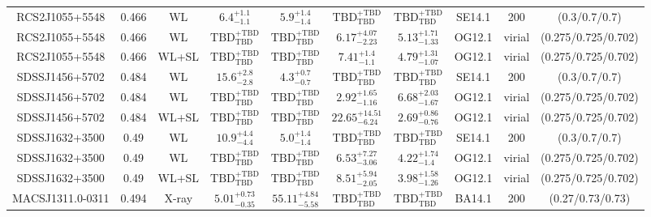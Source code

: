\begin{table}
\begin{tabular}{cccccccccc}
RCS2J1055+5548 & 0.466 & WL & ${6.4}^{+1.1}_{-1.1}$ & ${5.9}^{+1.4}_{-1.4}$ & ${\mathrm{TBD}}^{+\mathrm{TBD}}_{\mathrm{TBD}}$ & ${\mathrm{TBD}}^{+\mathrm{TBD}}_{\mathrm{TBD}}$ & SE14.1 & 200 & (0.3/0.7/0.7) \\
RCS2J1055+5548 & 0.466 & WL & ${\mathrm{TBD}}^{+\mathrm{TBD}}_{\mathrm{TBD}}$ & ${\mathrm{TBD}}^{+\mathrm{TBD}}_{\mathrm{TBD}}$ & ${6.17}^{+4.07}_{-2.23}$ & ${5.13}^{+1.71}_{-1.33}$ & OG12.1 & virial & (0.275/0.725/0.702) \\
RCS2J1055+5548 & 0.466 & WL+SL & ${\mathrm{TBD}}^{+\mathrm{TBD}}_{\mathrm{TBD}}$ & ${\mathrm{TBD}}^{+\mathrm{TBD}}_{\mathrm{TBD}}$ & ${7.41}^{+1.4}_{-1.1}$ & ${4.79}^{+1.31}_{-1.07}$ & OG12.1 & virial & (0.275/0.725/0.702) \\
SDSSJ1456+5702 & 0.484 & WL & ${15.6}^{+2.8}_{-2.8}$ & ${4.3}^{+0.7}_{-0.7}$ & ${\mathrm{TBD}}^{+\mathrm{TBD}}_{\mathrm{TBD}}$ & ${\mathrm{TBD}}^{+\mathrm{TBD}}_{\mathrm{TBD}}$ & SE14.1 & 200 & (0.3/0.7/0.7) \\
SDSSJ1456+5702 & 0.484 & WL & ${\mathrm{TBD}}^{+\mathrm{TBD}}_{\mathrm{TBD}}$ & ${\mathrm{TBD}}^{+\mathrm{TBD}}_{\mathrm{TBD}}$ & ${2.92}^{+1.65}_{-1.16}$ & ${6.68}^{+2.03}_{-1.67}$ & OG12.1 & virial & (0.275/0.725/0.702) \\
SDSSJ1456+5702 & 0.484 & WL+SL & ${\mathrm{TBD}}^{+\mathrm{TBD}}_{\mathrm{TBD}}$ & ${\mathrm{TBD}}^{+\mathrm{TBD}}_{\mathrm{TBD}}$ & ${22.65}^{+14.51}_{-6.24}$ & ${2.69}^{+0.86}_{-0.76}$ & OG12.1 & virial & (0.275/0.725/0.702) \\
SDSSJ1632+3500 & 0.49 & WL & ${10.9}^{+4.4}_{-4.4}$ & ${5.0}^{+1.4}_{-1.4}$ & ${\mathrm{TBD}}^{+\mathrm{TBD}}_{\mathrm{TBD}}$ & ${\mathrm{TBD}}^{+\mathrm{TBD}}_{\mathrm{TBD}}$ & SE14.1 & 200 & (0.3/0.7/0.7) \\
SDSSJ1632+3500 & 0.49 & WL & ${\mathrm{TBD}}^{+\mathrm{TBD}}_{\mathrm{TBD}}$ & ${\mathrm{TBD}}^{+\mathrm{TBD}}_{\mathrm{TBD}}$ & ${6.53}^{+7.27}_{-3.06}$ & ${4.22}^{+1.74}_{-1.4}$ & OG12.1 & virial & (0.275/0.725/0.702) \\
SDSSJ1632+3500 & 0.49 & WL+SL & ${\mathrm{TBD}}^{+\mathrm{TBD}}_{\mathrm{TBD}}$ & ${\mathrm{TBD}}^{+\mathrm{TBD}}_{\mathrm{TBD}}$ & ${8.51}^{+5.94}_{-2.05}$ & ${3.98}^{+1.58}_{-1.26}$ & OG12.1 & virial & (0.275/0.725/0.702) \\
MACSJ1311.0-0311 & 0.494 & X-ray & ${5.01}^{+0.73}_{-0.35}$ & ${55.11}^{+4.84}_{-5.58}$ & ${\mathrm{TBD}}^{+\mathrm{TBD}}_{\mathrm{TBD}}$ & ${\mathrm{TBD}}^{+\mathrm{TBD}}_{\mathrm{TBD}}$ & BA14.1 & 200 & (0.27/0.73/0.73) \\

\end{tabular}
\end{table}
